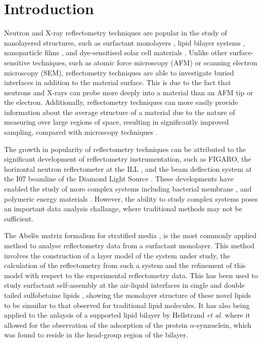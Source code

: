 \documentclass[amsmath,amssymb,twocolumn,superscriptaddress,aps,prl]{revtex4-1}
\begin{document}
\section{Introduction}
Neutron and X-ray reflectometry techniques are popular in the study of nanolayered structures, such as surfactant monolayers \cite{Hazell2016}, lipid bilayer systems \cite{Belicka2015}, nanoparticle films \cite{Velleman2016}, and dye-sensitised solar cell materials \cite{McCreeGrey2015}.
Unlike other surface-sensitive techniques, such as atomic force microscopy (AFM) or scanning electron microscopy (SEM), reflectometry techniques are able to investigate buried interfaces in addition to the material surface.
This is due to the fact that neutrons and X-rays can probe more deeply into a material than an AFM tip or the electron.
Additionally, reflectometry techniques can more easily provide information about the average structure of a material due to the nature of measuring over large regions of space, resulting in significantly improved sampling, compared with microscopy techniques \cite{Renaud2009}.

The growth in popularity of reflectometry techniques can be attributed to the significant development of reflectometry instrumentation, such as FIGARO, the horizontal neutron reflectometer at the ILL \cite{Campbell2011}, and the beam deflection system at the I07 beamline of the Diamond Light Source \cite{Arnold2012}.
These developments have enabled the study of more complex systems including bacterial membrane \cite{Barker2016}, and polymeric energy materials \cite{Khodakarimi2016}.
However, the ability to study complex systems poses an important data analysis challange, where traditional methods may not be sufficient.

The Abel\`{e}s matrix formalism for stratified media \cite{Abeles1950}, is the most commonly applied method to analyse reflectometry data from a surfactant monolayer.
This method involves the construction of a layer model of the system under study, the calculation of the reflectometry from such a system and the refinement of this model with respect to the experimental reflectometry data.
This has been used to study surfactant self-assembly at the air-liquid interfaces in single and double tailed sulfobetaine lipids \cite{Hazell2016}, showing the monolayer structure of these novel lipids to be simuilar to that observed for traditional lipid molecules.
It has also being applied to the anlaysis of a supported lipid bilayer by Hellstrand \emph{et al.} \cite{Hellstrand2013} where it allowed for the observation of the adsorption of the protein $\alpha$-synnuclein, which was found to reside in the head-group region of the bilayer.
\end{document}
